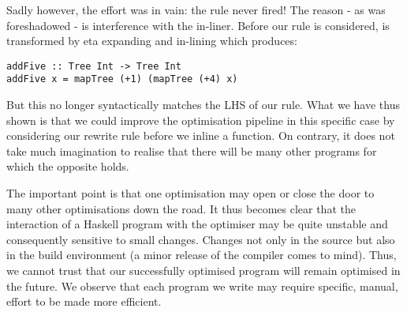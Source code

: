 Sadly however, the effort was in vain: the rule never fired! The reason - as was
foreshadowed - is interference with the in-liner. Before our rule is considered, 
is transformed by eta expanding and in-lining  which produces: 

\begin{verbatim}
addFive :: Tree Int -> Tree Int
addFive x = mapTree (+1) (mapTree (+4) x)
\end{verbatim}

But this no longer syntactically matches the LHS of our  rule. What we have thus shown
is that we could improve the optimisation pipeline in this specific case by considering our
rewrite rule before we inline a function. On contrary, it does not take much imagination to
realise that there will be many other programs for which the opposite holds.

The important point is that one optimisation may open or close the door to many other
optimisations down the road. It thus becomes clear that the interaction of a Haskell program
with the optimiser may be quite unstable and consequently sensitive to small changes. 
Changes not only in the source but also in the build environment (a minor release of
the compiler comes to mind). Thus, we cannot trust that our successfully optimised program will remain
optimised in the future. We observe that each program we write may require specific, manual, 
effort to be made more efficient.
